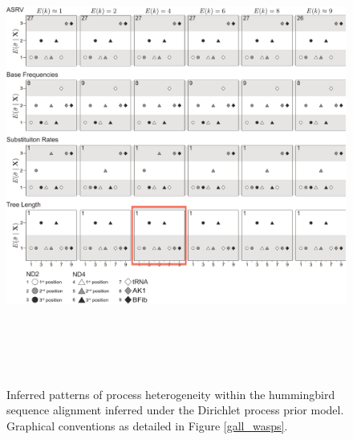 \documentclass[11pt]{article}
\begin{document}
\begin{figure}[h] 
\centering 
\includegraphics[angle=90, height=150mm]{figures/figure_4.pdf} 
\caption{Inferred patterns of process heterogeneity within the hummingbird sequence alignment inferred under the Dirichlet process prior model.  Graphical conventions as detailed in Figure \ref{gall_wasps}.}
\label{hummers}
\end{figure} 
\end{document}
